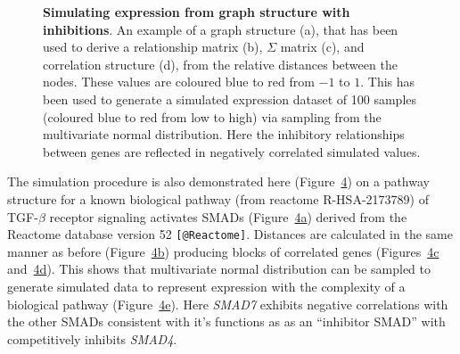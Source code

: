 \documentclass[]{article}
\begin{document}
\begin{figure}
{}

\caption{\textbf{Simulating expression from graph structure with inhibitions}. An example of a graph structure (a), that has been used to derive a relationship matrix (b), $\Sigma$ matrix (c), and correlation structure (d), from the relative distances between the nodes. These values are coloured blue to red from $-1$ to $1$. This has been used to generate a simulated expression dataset of 100 samples (coloured blue to red from low to high) via sampling from the multivariate normal distribution. Here the inhibitory relationships between genes are reflected in negatively correlated simulated  values.}\label{fig:simulation_inhibiting}
\end{figure}

The simulation procedure is also demonstrated here
(Figure~\protect\hyperlink{fig:simulation_smad}{4}) on a pathway
structure for a known biological pathway (from reactome R-HSA-2173789)
of TGF-\(\beta\) receptor signaling activates SMADs
(Figure~\protect\hyperlink{fig:simulation_smad:first}{4a}) derived from
the Reactome database version 52 \texttt{{[}@Reactome{]}}. Distances are
calculated in the same manner as before
(Figure~\protect\hyperlink{fig:simulation_smad:second}{4b}) producing
blocks of correlated genes
(Figures~\protect\hyperlink{fig:simulation_smad:third}{4c}
and~\protect\hyperlink{fig:simulation_smad:fifth}{4d}). This shows that
multivariate normal distribution can be sampled to generate simulated
data to represent expression with the complexity of a biological pathway
(Figure~\protect\hyperlink{fig:simulation_smad:fourth}{4e}). Here
\emph{SMAD7} exhibits negative correlations with the other SMADs
consistent with it's functions as as an ``inhibitor SMAD'' with
competitively inhibits \emph{SMAD4}.
\end{document}
